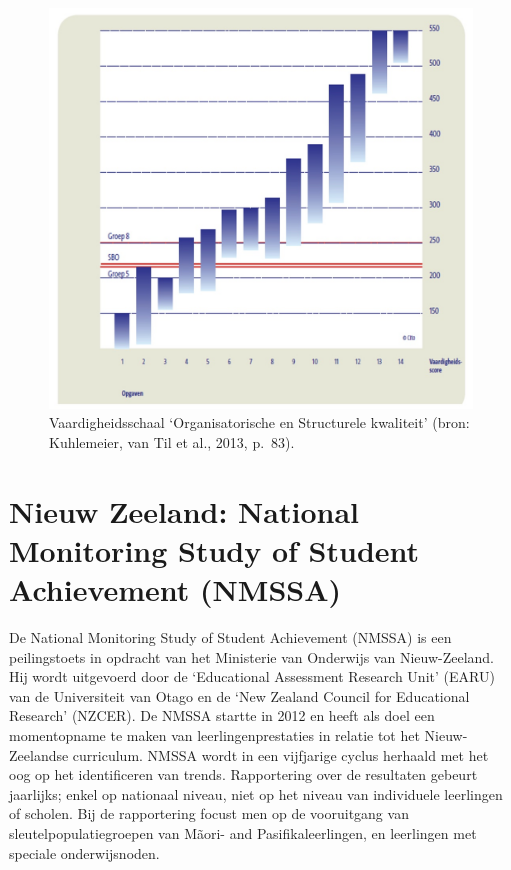 \documentclass[
  letterpaper,
]{report}
\begin{document}
\begin{figure}

{\centering \includegraphics{./FIG5.jpg}

}

\caption{\label{fig-figuur5}Vaardigheidsschaal `Organisatorische en
Structurele kwaliteit' (bron: Kuhlemeier, van Til et al., 2013, p.~83).}

\end{figure}

\hypertarget{nieuw-zeeland-national-monitoring-study-of-student-achievement-nmssa}{%
\section{Nieuw Zeeland: National Monitoring Study of Student Achievement
(NMSSA)}\label{nieuw-zeeland-national-monitoring-study-of-student-achievement-nmssa}}

De National Monitoring Study of Student Achievement (NMSSA) is een
peilingstoets in opdracht van het Ministerie van Onderwijs van
Nieuw-Zeeland. Hij wordt uitgevoerd door de `Educational Assessment
Research Unit' (EARU) van de Universiteit van Otago en de `New Zealand
Council for Educational Research' (NZCER). De NMSSA startte in 2012 en
heeft als doel een momentopname te maken van leerlingenprestaties in
relatie tot het Nieuw-Zeelandse curriculum. NMSSA wordt in een
vijfjarige cyclus herhaald met het oog op het identificeren van trends.
Rapportering over de resultaten gebeurt jaarlijks; enkel op nationaal
niveau, niet op het niveau van individuele leerlingen of scholen. Bij de
rapportering focust men op de vooruitgang van sleutelpopulatiegroepen
van Mãori- and Pasifikaleerlingen, en leerlingen met speciale
onderwijsnoden.
\end{document}
